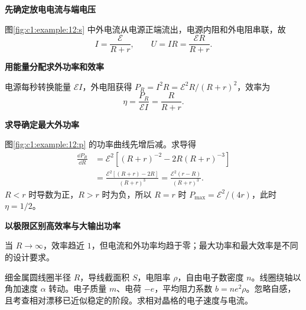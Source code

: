 \begin{solution}\textbf{先确定放电电流与端电压}\par\nobreak
图\ref{fig:c1:example:12:s} 中外电流从电源正端流出，电源内阻和外电阻串联，故
\[
 I=\frac{\mathcal E}{R+r},\qquad U=IR=\frac{\mathcal ER}{R+r}.
\]


\par\medskip{}\noindent\textbf{用能量分配求外功率和效率}\par\nobreak
电源每秒转换能量 $\mathcal EI$，外电阻获得 $P_R=I^2R=\mathcal E^2R/(R+r)^2$，效率为
\[
 \eta=\frac{P_R}{\mathcal EI}=\frac{R}{R+r}.
\]



\par\medskip{}\noindent\textbf{求导确定最大外功率}\par\nobreak
图\ref{fig:c1:example:12:p} 的功率曲线先增后减。求导得
\[
 \begin{aligned}
 \frac{\dd P_R}{\dd R}
 &=\mathcal E^2\left[(R+r)^{-2}-2R(R+r)^{-3}\right]\\
 &=\frac{\mathcal E^2[(R+r)-2R]}{(R+r)^3}
 =\frac{\mathcal E^2(r-R)}{(R+r)^3}.
\end{aligned}
\]
$R<r$ 时导数为正，$R>r$ 时为负，所以 $R=r$ 时 $P_{\max}=\mathcal E^2/(4r)$，此时 $\eta=1/2$。

\par\medskip{}\noindent\textbf{以极限区别高效率与大输出功率}\par\nobreak
当 $R\to\infty$，效率趋近 $1$，但电流和外功率均趋于零；最大功率和最大效率是不同的设计要求。\end{solution}
\begin{question}\begin{example}[角加速导线圈中的惯性电流]\label{c1:example:13}
细金属圆线圈半径 $R$，导线截面积 $S$，电阻率 $\rho$，自由电子数密度 $n$。线圈绕轴以角加速度 $\alpha$ 转动。电子质量 $m$、电荷 $-e$，平均阻力系数 $b=ne^2\rho$。忽略自感，且考查相对漂移已近似稳定的阶段。求相对晶格的电子速度与电流。
\end{example}
\end{question}

